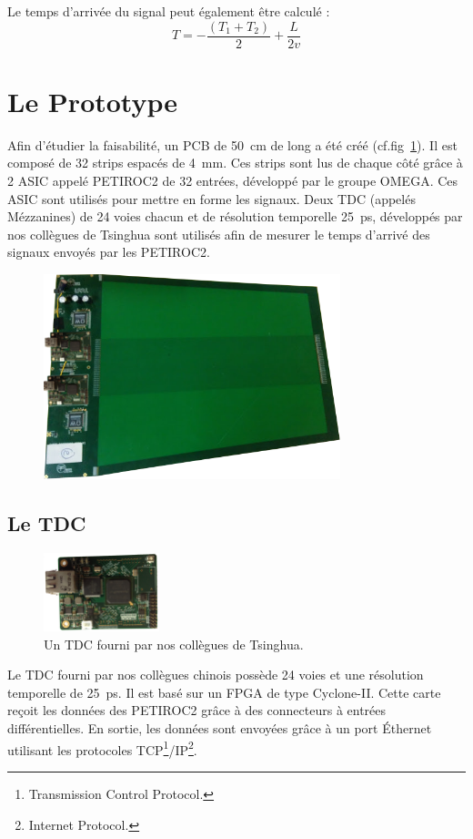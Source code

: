 Le temps d'arrivée du signal peut également être calculé :
\begin{equation}
\label{myformule}
T=-\frac{(T_1+T_2)}{2}+\frac{L}{2v}
\end{equation}

\section{Le Prototype}
Afin d'étudier la faisabilité, un PCB de \SI{50}{\centi\meter} de long a été créé (cf.fig~\ref{PCB2}). Il est composé de \num{32} strips espacés de \SI{4}{\milli\meter}. Ces strips sont lus de chaque côté grâce à \num{2} ASIC appelé PETIROC2 \cite{Monzo:2017quz} de \num{32} entrées, développé par le groupe OMEGA. Ces ASIC sont utilisés pour mettre en forme les signaux. Deux TDC (appelés Mézzanines) de \num{24} voies chacun et de résolution temporelle \SI{25}{\pico\second}, développés par nos collègues de Tsinghua sont utilisés afin de mesurer le temps d'arrivé des signaux envoyés par les PETIROC2.

\begin{figure}[ht!]
	\centering
	\includegraphics[width=0.77\textwidth]{ELE/PCB2.png}
	\label{PCB2}
\end{figure}

\subsection{Le TDC}
\begin{figure}
	\vspace*{-1cm}
	\centering
	\includegraphics[width=0.30\textwidth]{ELE/TDC.png}
	\caption{Un TDC fourni par nos collègues de Tsinghua.}
	\label{tdc}
\end{figure}
Le TDC fourni par nos collègues chinois possède \num{24} voies et une résolution temporelle de \SI{25}{\pico\second}. Il est basé sur un FPGA de type Cyclone-II. Cette carte reçoit les données des PETIROC2 grâce à des connecteurs à entrées différentielles. En sortie, les données sont envoyées grâce à un port Éthernet utilisant les protocoles TCP\footnote{Transmission Control Protocol.}/IP\footnote{Internet Protocol.}.

